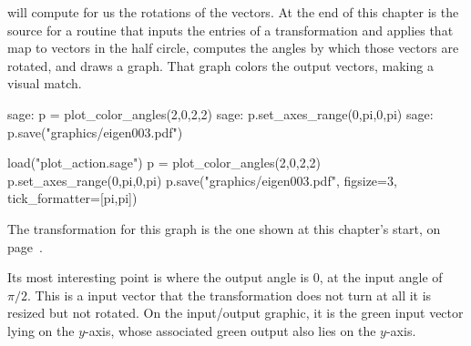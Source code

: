 \Sage{} will compute for us the rotations of the vectors.
At the end of this chapter is the source for a routine 
 that
inputs the entries of a transformation and applies that map
to vectors in the half circle, 
computes the angles by which those
vectors are rotated, and draws a graph. 
That graph colors the output vectors,
making a visual match.
\begin{sagecommandline}
sage: p = plot_color_angles(2,0,2,2)
sage: p.set_axes_range(0,pi,0,pi)
sage: p.save("graphics/eigen003.pdf")
\end{sagecommandline}
\begin{sagesilent}
load("plot_action.sage")  
p = plot_color_angles(2,0,2,2)
p.set_axes_range(0,pi,0,pi)
p.save("graphics/eigen003.pdf", figsize=3, tick_formatter=[pi,pi])
\end{sagesilent}
The transformation for this graph is the one shown at this
chapter's start, on page~\pageref{gr:firstgraphic}.
\begin{center}
\end{center}
Its most interesting point is where the output angle is $0$,
at the input angle of~$\pi/2$.
This is a input vector that the transformation does not turn at all\Dash 
it is resized but not rotated.
On the input/output graphic, it is
the green input vector lying on the $y$-axis, whose
associated green output also lies on the $y$-axis.




